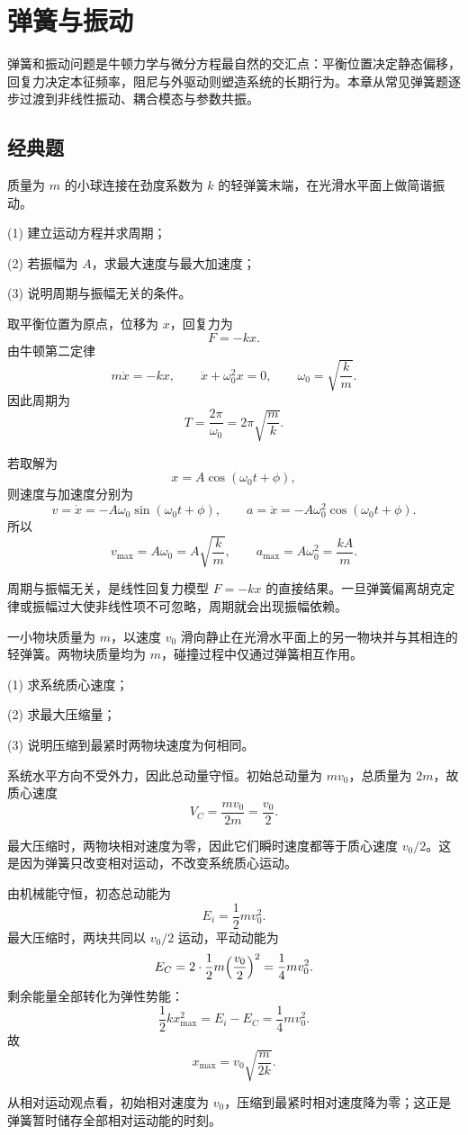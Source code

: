 \chapter{弹簧与振动}

弹簧和振动问题是牛顿力学与微分方程最自然的交汇点：平衡位置决定静态偏移，回复力决定本征频率，阻尼与外驱动则塑造系统的长期行为。本章从常见弹簧题逐步过渡到非线性振动、耦合模态与参数共振。

\section*{经典题}

\begin{classic}
质量为 $m$ 的小球连接在劲度系数为 $k$ 的轻弹簧末端，在光滑水平面上做简谐振动。

(1) 建立运动方程并求周期；

(2) 若振幅为 $A$，求最大速度与最大加速度；

(3) 说明周期与振幅无关的条件。

\begin{solution}
取平衡位置为原点，位移为 $x$，回复力为
\[
F=-kx.
\]
由牛顿第二定律
\[
m\ddot x=-kx,
\qquad
\ddot x+\omega_0^2 x=0,
\qquad
\omega_0=\sqrt{\frac{k}{m}}.
\]
因此周期为
\[
T=\frac{2\pi}{\omega_0}=2\pi\sqrt{\frac{m}{k}}.
\]

若取解为
\[
x=A\cos(\omega_0 t+\phi),
\]
则速度与加速度分别为
\[
v=\dot x=-A\omega_0\sin(\omega_0 t+\phi),
\qquad
a=\ddot x=-A\omega_0^2\cos(\omega_0 t+\phi).
\]
所以
\[
v_{\max}=A\omega_0=A\sqrt{\frac{k}{m}},
\qquad
a_{\max}=A\omega_0^2=\frac{kA}{m}.
\]

周期与振幅无关，是线性回复力模型 $F=-kx$ 的直接结果。一旦弹簧偏离胡克定律或振幅过大使非线性项不可忽略，周期就会出现振幅依赖。
\end{solution}
\end{classic}

\begin{classic}
一小物块质量为 $m$，以速度 $v_0$ 滑向静止在光滑水平面上的另一物块并与其相连的轻弹簧。两物块质量均为 $m$，碰撞过程中仅通过弹簧相互作用。

(1) 求系统质心速度；

(2) 求最大压缩量；

(3) 说明压缩到最紧时两物块速度为何相同。

\begin{solution}
系统水平方向不受外力，因此总动量守恒。初始总动量为 $mv_0$，总质量为 $2m$，故质心速度
\[
V_C=\frac{mv_0}{2m}=\frac{v_0}{2}.
\]

最大压缩时，两物块相对速度为零，因此它们瞬时速度都等于质心速度 $v_0/2$。这是因为弹簧只改变相对运动，不改变系统质心运动。

由机械能守恒，初态总动能为
\[
E_i=\frac12 mv_0^2.
\]
最大压缩时，两块共同以 $v_0/2$ 运动，平动动能为
\[
E_C=2\cdot \frac12 m\qty(\frac{v_0}{2})^2=\frac14 mv_0^2.
\]
剩余能量全部转化为弹性势能：
\[
\frac12 kx_{\max}^2=E_i-E_C=\frac14 mv_0^2.
\]
故
\[
x_{\max}=v_0\sqrt{\frac{m}{2k}}.
\]

从相对运动观点看，初始相对速度为 $v_0$，压缩到最紧时相对速度降为零；这正是弹簧暂时储存全部相对运动能的时刻。
\end{solution}
\end{classic}

